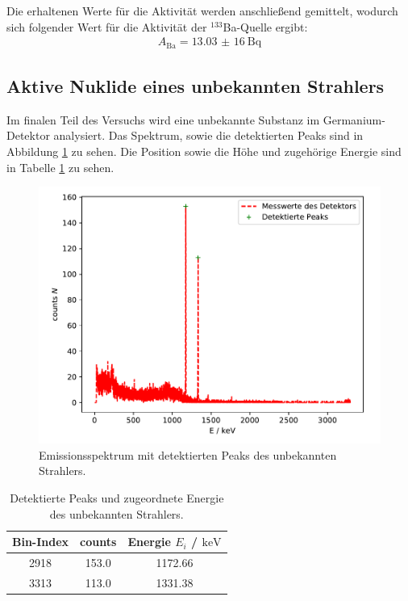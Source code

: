\FloatBarrier
Die erhaltenen Werte für die Aktivität werden anschließend gemittelt, wodurch sich folgender Wert für die Aktivität der $^{133}$Ba-Quelle ergibt:
\begin{align*}
    A_\text{Ba} = \SI{13,03(16)}{\becquerel}
\end{align*}
\FloatBarrier


\subsection{Aktive Nuklide eines unbekannten Strahlers}
Im finalen Teil des Versuchs wird eine unbekannte Substanz im Germanium-Detektor analysiert. Das Spektrum, sowie die detektierten Peaks sind in Abbildung \ref{abb:unbekannt} zu sehen. Die Position sowie die Höhe und zugehörige Energie sind in Tabelle \ref{tab:unbekannt} zu sehen.
\FloatBarrier
\begin{figure}
    \centering
    \includegraphics[scale=0.7]{unbekannterStrahler.pdf}
    \caption{Emissionsspektrum mit detektierten Peaks des unbekannten Strahlers.}
    \label{abb:unbekannt}
\end{figure}
\FloatBarrier
\begin{table}
    \centering
    \caption{Detektierte Peaks und zugeordnete Energie des unbekannten Strahlers.}
    \label{tab:unbekannt}
    \begin{tabular}{ c c c }
    \toprule
    {Bin-Index} & {counts } & {Energie $E_i$ / $\si{\kilo\electronvolt}$}\\
    \midrule
    2918 & 153.0 & 1172.66       \\
    3313 & 113.0 & 1331.38       \\
    \bottomrule
    \end{tabular}
\end{table}
\FloatBarrier

